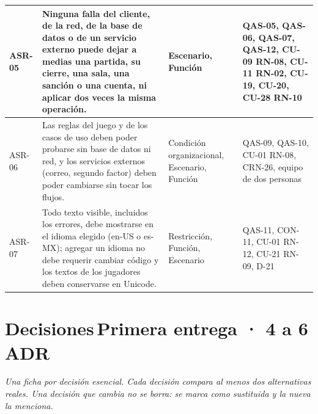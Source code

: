 \documentclass[11pt,letterpaper]{article}
\newcommand{\hint}[1]{{\itshape\color{black!70}#1}\par} %
\newcommand{\bluebadge}[1]{\hspace{0.8em}\colorbox{SADBlueBg}{\scriptsize\bfseries\color{SADBlue}\,#1\,}}
\begin{document}
\begin{xltabular}{\linewidth}{|p{1.7cm}|Y|Y|Y|}
  ASR-05 & Ninguna falla del cliente, de la red, de la base de datos o de un servicio externo puede dejar a medias una partida, su cierre, una sala, una sanción o una cuenta, ni aplicar dos veces la misma operación. & Escenario, Función & QAS-05, QAS-06, QAS-07, QAS-12, CU-09 RN-08, CU-11 RN-02, CU-19, CU-20, CU-28 RN-10\\\hline
  ASR-06 & Las reglas del juego y de los casos de uso deben poder probarse sin base de datos ni red, y los servicios externos (correo, segundo factor) deben poder cambiarse sin tocar los flujos. & Condición organizacional, Escenario, Función & QAS-09, QAS-10, CU-01 RN-08, CRN-26, equipo de dos personas\\\hline
  ASR-07 & Todo texto visible, incluidos los errores, debe mostrarse en el idioma elegido (en-US o es-MX); agregar un idioma no debe requerir cambiar código y los textos de los jugadores deben conservarse en Unicode. & Restricción, Función, Escenario & QAS-11, CON-11, CU-01 RN-12, CU-21 RN-09, D-21\\\hline
\end{xltabular}
\section{Decisiones\bluebadge{Primera entrega · 4 a 6 ADR}}
\hint{Una ficha por decisión esencial. Cada decisión compara al menos dos alternativas reales. Una decisión que cambia no se borra: se marca como sustituida y la nueva la menciona.}
\end{document}
